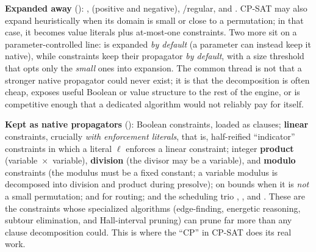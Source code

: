 \textbf{Expanded away} ():
,
 (positive and negative),
/regular, and
. CP-SAT may also expand
 heuristically when its domain
is small or close to a permutation; in that case, it becomes value literals plus
at-most-one constraints. Two more sit on a parameter-controlled line:
 is expanded \emph{by default} (a
parameter can instead keep it native), while
 constraints keep their propagator
\emph{by default}, with a size threshold that opts only the \emph{small} ones into
expansion.
The common thread is not
that a stronger native propagator could never exist; it is that the decomposition
is often cheap, exposes useful Boolean or value structure to the rest of the
engine, or is competitive enough that a dedicated algorithm would not reliably
pay for itself.

\textbf{Kept as native propagators} (): Boolean
constraints, loaded as clauses; \textbf{linear} constraints, crucially
\emph{with enforcement literals}, that is, half-reified ``indicator'' constraints
in which a literal $\ell$ enforces a linear constraint; integer \textbf{product}
(variable~$\times$~variable), \textbf{division} (the divisor may be a variable),
and \textbf{modulo} constraints (the modulus must be a fixed constant; a variable
modulus is decomposed into division and product during presolve);
 on bounds when it is \emph{not} a
small permutation;  and
 for routing; and the scheduling trio
, , and
. These are the constraints whose specialized
algorithms (edge-finding, energetic reasoning, subtour elimination, and
Hall-interval pruning) can prune far more than any clause decomposition could.
This is where the ``CP'' in CP-SAT does its real work.

